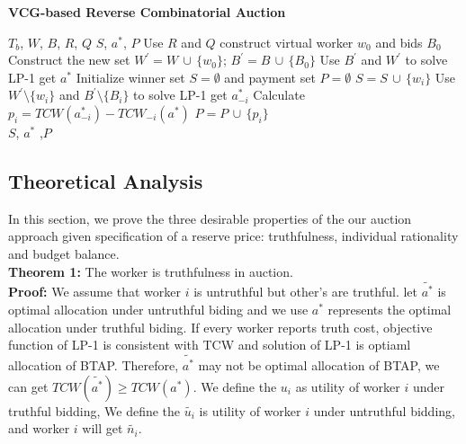 \renewcommand{\algorithmicrequire}{\textbf{Input:}}
\renewcommand{\algorithmicensure}{\textbf{Output:}}
\begin{algorithm}
    \caption{\textbf{VCG-based Reverse Combinatorial Auction}}
    \begin{algorithmic}[1]
        \Require $T_b$, $W$, $B$, $R$, $Q$
        \Ensure $S$, $a^{\ast}$, $P$
        \State Use $R$ and $Q$ construct virtual worker $w_0$  and bids $B_0$
        \State Construct the new set $W^{'} = W\,\cup\,\{w_0\}$; $B^{'} = B\,\cup \,\{B_0\}$
        \State Use $B^{'}$ and $W^{'}$ to solve LP-1 get $a^{\ast}$
        \State Initialize winner set $S = \emptyset$ and payment set $P = \emptyset $
                \State $S = S \,\cup\,\{w_i\}$
            \EndIf
        \EndFor
            \State Use $W^{'} \setminus \{w_i\}$ and $B^{'} \setminus \{B_i\}$ to solve LP-1 get $a_{-i}^{\ast}$
            \State Calculate $p_i = TCW(a_{-i}^{\ast}) - TCW_{-i}(a^{\ast})$
            \State $P = P \, \cup \,\{p_i\}$
        \EndFor\\
        \Return $S$, $a^{\ast}$ ,$P$
    \end{algorithmic}
\end{algorithm}
\subsection{Theoretical Analysis}
In this section, we prove the three desirable properties of the our auction approach given specification of a reserve
price: truthfulness, individual rationality and budget balance.\\
\textbf{Theorem 1:} The worker is truthfulness in auction.\\
\textbf{Proof:} We assume that worker $i$ is untruthful but other's are truthful. let $\tilde{a^{\ast}}$ is optimal allocation under untruthful biding and we use $a^{\ast}$ represents the optimal allocation under truthful biding. If every worker reports truth cost, objective function of LP-1 is consistent with TCW and solution of LP-1 is optiaml allocation of BTAP. Therefore, $\tilde{a^{\ast}}$ may not be optimal allocation of BTAP, we can get $TCW(\tilde{a^{\ast}}) \geq  TCW(a^{\ast})$. We define the $u_i$ as utility of worker $i$ under truthful bidding, We define the $\tilde{u_i}$ is utility of worker $i$ under untruthful bidding, and worker $i$ will get $\tilde{n_i}$.

